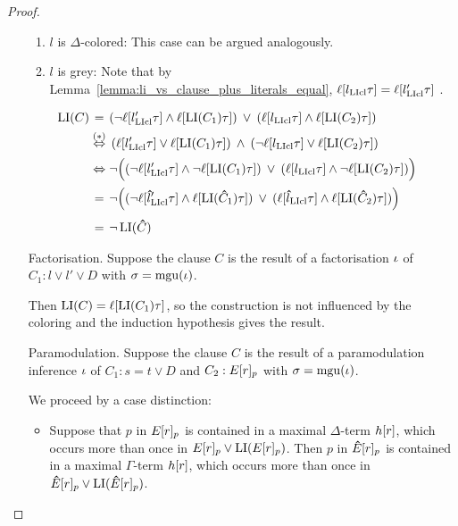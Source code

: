\documentclass[,%
	draft=false,%
	numbers=noendperiod
	11pt,
	a4paper,
	oneside,%
	openany,
]{memoir}
\begin{document}
\begin{proof}
\begin{itemize}
\begin{enumerate}
				\item $l$ is $\Delta$-colored:
					This case can be argued analogously.

				\item $l$ is grey:
					Note that by Lemma~\ref{lemma:li_vs_clause_plus_literals_equal}, $\ell[l_{\operatorname{LIcl}}\tau] = \ell[l'_{\operatorname{LIcl}}\tau]$ \markB.
					\begin{align*}
						\hspace*{\dimexpr-\leftmargini-\leftmarginii}
						\LI(C) &\stackrel{{\phantom{\markB}}}=
						(\lnot {\lifboth{l'\cll\tau}} \land \lifboth{\LI(C_1)\tau}) \spam\lor 
						(\lifboth{l\cll\tau} \land \lifboth{\LI(C_2)\tau})\\
						&\stackrel{{\markB}}\semiff\,
						({\lifboth{l'\cll\tau}} \lor \lifboth{\LI(C_1)\tau}) \spam\land 
						(\lnot \lifboth{l\cll\tau} \lor \lifboth{\LI(C_2)\tau})\\
						&\stackrel{{\phantom{\markB}}}\semiff \lnot \Big( (\lnot {\lifboth{l'\cll\tau}} \land \lnot \lifboth{\LI(C_1)\tau}) \spam\lor 
						(\lifboth{l\cll\tau} \land \lnot\lifboth{\LI(C_2)\tau}) \Big) \\
						&\stackrel{{\phantom{\markB}}}=\lnot \Big( (\lnot {\lifboth{\bhat l'\cll\tau}} \land \lifboth{\LI(\bhat C_1)\tau}) \spam\lor 
						(\lifboth{\bhat l\cll\tau} \land \lifboth{\LI(\bhat C_2)\tau}) \Big)\\
						& \stackrel{{\phantom{\markB}}}= \lnot \LI(\bhat C) 
					\end{align*}


			\end{enumerate}



		\item[Factorisation.]
			Suppose the clause $C$ is the result of a factorisation $\iota$ of $C_1: l \lor l' \lor D$ 
			with $\sigma = \operatorname{mgu}(\iota)$.

			Then $\operatorname{LI}(C) = \ell[\operatorname{LI}(C_1)\tau]$, so the construction is not influenced by the coloring and the induction hypothesis gives the result.

		\item[Paramodulation.]
			Suppose the clause $C$ is the result of a paramodulation inference $\iota$ of $C_1: s=t \lor D$ and $C_2: E{[r]_{p}}$ with $\sigma=\operatorname{mgu}(\iota)$.


			We proceed by a case distinction:
			\begin{itemize}
				\item Suppose that $p$ in $E{[r]_{p}}$ is contained in a maximal $\Delta$-term $h[r]$, which occurs more than once in $E{[r]_{p}} \lor \operatorname{LI}(E{[r]_{p}})$. 
					Then $p$ in $\bm\hat E{[r]_{p}}$ is contained in a maximal $\Gamma$-term $h[r]$, which occurs more than once in $\bm\hat E{[r]_{p}} \lor \operatorname{LI}(\bm\hat E{[r]_{p}})$. 


\end{itemize}
\end{itemize}
\end{proof}
\end{document}
